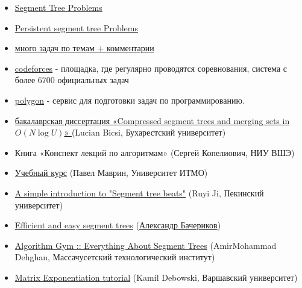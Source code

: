 


\begin{itemize}
	
	\item \href{https://codeforces.com/blog/entry/22616}{Segment Tree Problems}
	
	\item \href{https://codeforces.com/blog/entry/56880}{Persistent segment tree Problems}
	
	\item \href{https://codeforces.com/blog/entry/55274}{много задач по темам + комментарии}
	
	\item \href{https://codeforces.com}{codeforces} - площадка, где регулярно проводятся соревнования, система с более 6700 официальных задач
	
	\item \href{https://polygon.codeforces.com}{polygon} - сервис для подготовки задач по программированию.
	
	\item \href{https://codeforces.com/blog/entry/83170}{бакалаврская диссертация «Compressed segment trees and merging sets in $O(N \log U)$» } (Lucian Bicsi, Бухарестский университет)
	
	
	\item Книга «Конспект лекций по алгоритмам» (Сергей Копелиович, НИУ ВШЭ)
	
	\item \href{https://codeforces.com/edu/course/2}{Учебный курс} (Павел Маврин, Университет ИТМО)
	\item \href{https://codeforces.com/blog/entry/57319}{A simple introduction to "Segment tree beats"} (Ruyi Ji, Пекинский университет)
	
	\item \href{https://codeforces.com/blog/entry/18051}{Efficient and easy segment trees} (\href{http://finals.snarknews.info/index.cgi?data=2011/teams/knu&class=final2011&year=2011}{Александр Бачериков})
	
	\item \href{https://codeforces.com/blog/entry/15890}{Algorithm Gym :: Everything About Segment Trees} (AmirMohammad Dehghan, Массачусетский технологический институт)
	
	\item \href{https://codeforces.com/blog/entry/80195}{Matrix Exponentiation tutorial} (Kamil Debowski, Варшавский университет)
	

\end{itemize}
